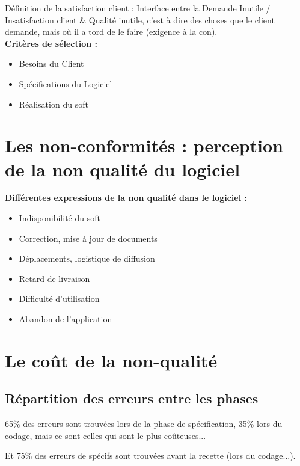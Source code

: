 Définition de la satisfaction client : Interface entre la Demande Inutile / Insatisfaction client \& Qualité inutile, c’est à dire des choses que le client demande, mais où il a tord de le faire (exigence à la con).\\

	\textbf{Critères de sélection  :}\hfill\\
	\begin{itemize}
		\item Besoins du Client
		\item Spécifications du Logiciel
		\item Réalisation du soft
	\end{itemize}


\section{Les non-conformités : perception de la non qualité du logiciel}

\textbf{Différentes expressions de la non qualité dans le logiciel :}\hfill\\

\begin{itemize}
    \item Indisponibilité du soft
    \item Correction, mise à jour de documents
    \item Déplacements, logistique de diffusion
    \item Retard de livraison
    \item Difficulté d’utilisation
    \item Abandon de l’application
\end{itemize}




\section{Le coût de la non-qualité}

	\subsection{Répartition des erreurs entre les phases}



65\% des erreurs sont trouvées lors de la phase de spécification, 35\% lors du codage, mais ce sont celles qui sont le plus coûteuses...

Et  75\% des erreurs de spécifs sont trouvées avant la recette (lors du codage...).

